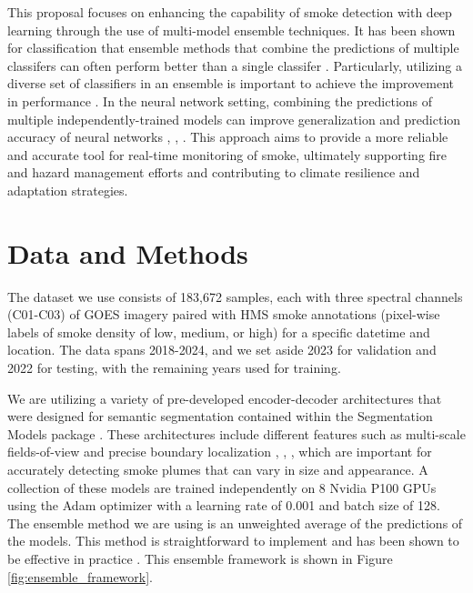 \documentclass{article}
\begin{document}
This proposal focuses on enhancing the capability of smoke detection with deep learning through the use of multi-model ensemble techniques. It has been shown for classification that ensemble methods that combine the predictions of multiple classifers can often perform better than a single classifer \citep{ensemble-ml}. Particularly, utilizing a diverse set of classifiers in an ensemble is important to achieve the improvement in performance \citep{ensemble-diversity}. In the neural network setting, combining the predictions of multiple independently-trained models can improve generalization and prediction accuracy of neural networks \citep{nn-ensemble}, \citep{nn-ensemble2}, \citep{nn-error-ens}. This approach aims to provide a more reliable and accurate tool for real-time monitoring of smoke, ultimately supporting fire and hazard management efforts and contributing to climate resilience and adaptation strategies.

\section{Data and Methods}
The dataset we use consists of 183,672 samples, each with three spectral channels (C01-C03) of GOES imagery paired with HMS smoke annotations (pixel-wise labels of smoke density of low, medium, or high) for a specific datetime and location. The data spans 2018-2024, and we set aside 2023 for validation and 2022 for testing, with the remaining years used for training. 

We are utilizing a variety of pre-developed encoder-decoder architectures that were designed for semantic segmentation contained within the Segmentation Models package \citep{semantic}. These architectures include different features such as multi-scale fields-of-view and precise boundary localization \citep{dlv3p}, \citep{PAN}, \citep{UNetpp}, which are important for accurately detecting smoke plumes that can vary in size and appearance. A collection of these models are trained independently on 8 Nvidia P100 GPUs using the Adam optimizer with a learning rate of 0.001 and batch size of 128. 
The ensemble method we are using is an unweighted average of the predictions of the models. This method is straightforward to implement and has been shown to be effective in practice \citep{nn-ensemble2}. This ensemble framework is shown in Figure \ref{fig:ensemble_framework}. 
\end{document}
